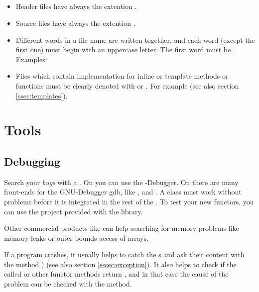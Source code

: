 \subsection{}

\begin{itemize}
\item Header files have always the extention .
\item Source files have always the extention .
\item Different words in a file name are written together, and each word
  (except the first one) must begin with an uppercase letter.  The first word
  must be .  Examples:  
\item Files which contain implementation for inline or template methods or
  functions must be clearly denoted with  or
  .  For example 
   (see also section \ref{ssec:templates}).
\end{itemize}

\section{Tools}

\subsection{Debugging}

Search your \emph{bugs} with a .  On 
you can use the \visualc-Debugger.  On  there are many
front-ends for the GNU-Debugger gdb, like ,  and
.  A class must work without problems before it is integrated in
the rest of the \ltilib.  To test your new functors, you can use the
 project provided with the library.

Other commercial products like  can help searching for memory
problems like memory leaks or outer-bounds access of arrays.

If a program crashes, it usually helps to catch the s and
ask their content with the method ) (see also section
\ref{sssec:exception}).  It also helps to check if the called 
or other functor methods return , and in that case the cause of
the problem can be checked with the  method.

